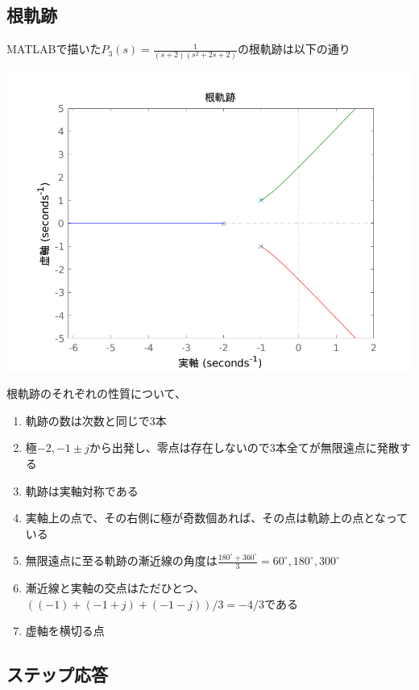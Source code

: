 \documentclass[dvipdfmx, twocolumn]{jsarticle}
\begin{document}
\subsection{根軌跡}

MATLABで描いた$P_{3}(s) = \frac{1}{(s+2)(s^{2}+2s+2)}$の根軌跡は以下の通り

\includegraphics[scale = 0.5]{rlocus.png}


根軌跡のそれぞれの性質について、

\begin{enumerate}
\item 軌跡の数は次数と同じで3本

\item 極$-2, -1\pm j$から出発し、零点は存在しないので3本全てが無限遠点に発散する

\item 軌跡は実軸対称である

\item 実軸上の点で、その右側に極が奇数個あれば、その点は軌跡上の点となっている

\item 無限遠点に至る軌跡の漸近線の角度は$\frac{180^{\circ}+360^{\circ}}{3} = 60^{\circ}, 180^{\circ}, 300^{\circ}$

\item 漸近線と実軸の交点はただひとつ、$((-1)+(-1+j)+(-1-j))/3 = -4/3$である

\item 虚軸を横切る点
\end{enumerate}
\subsection{ステップ応答}
\end{document}

